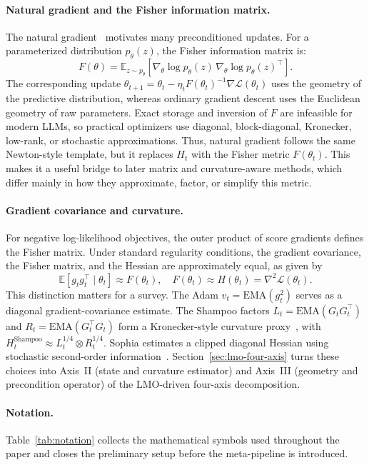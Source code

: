 \paragraph{Natural gradient and the Fisher information matrix.}
The natural gradient~\cite{amari1998natural} motivates many preconditioned
updates.  For a parameterized distribution $p_\theta(z)$, the Fisher
information matrix is:
\begin{equation}
  F(\theta)=\mathbb{E}_{z\sim p_\theta}\!\left[
    \nabla_\theta\log p_\theta(z)\,
    \nabla_\theta\log p_\theta(z)^\top
  \right].
  \label{eq:fisher-matrix}
\end{equation}
The corresponding update
$\theta_{t+1}=\theta_t-\eta_t F(\theta_t)^{-1}\nabla\mathcal{L}(\theta_t)$
uses the geometry of the predictive distribution, whereas ordinary gradient
descent uses the Euclidean geometry of raw parameters.  Exact storage and inversion of $F$ are infeasible
for modern LLMs, so practical optimizers use diagonal, block-diagonal,
Kronecker, low-rank, or stochastic approximations.
Thus, natural gradient follows the same Newton-style template, but it
replaces $H_t$ with the Fisher metric $F(\theta_t)$.  This makes it a useful
bridge to later matrix and curvature-aware methods, which differ mainly in how
they approximate, factor, or simplify this metric.

\paragraph{Gradient covariance and curvature.}
For negative log-likelihood objectives, the outer product of score gradients
defines the Fisher matrix.  Under standard regularity conditions, the gradient
covariance, the Fisher matrix, and the Hessian are approximately equal, as
given by
\begin{equation}
  \mathbb{E}\!\left[g_t g_t^\top\mid\theta_t\right]
  \approx F(\theta_t),
  \quad
  F(\theta_t) \approx H(\theta_t)=\nabla^2\mathcal{L}(\theta_t).
  \label{eq:fisher-identity}
\end{equation}
This distinction matters for a survey.  The Adam $v_t=\mathrm{EMA}(g_t^2)$ serves as a diagonal gradient-covariance estimate.  The Shampoo factors $L_t=\mathrm{EMA}(G_tG_t^\top)$ and $R_t=\mathrm{EMA}(G_t^\top G_t)$ form a Kronecker-style curvature proxy~\cite{gupta2018shampoo}, with $H_t^{\mathrm{Shampoo}}\approx L_t^{1/4}\otimes R_t^{1/4}$. Sophia estimates a clipped diagonal Hessian using stochastic second-order information~\cite{liu2023sophia}.  Section~\ref{sec:lmo-four-axis} turns these choices into Axis~II (state and curvature estimator) and Axis~III
(geometry and precondition operator) of the LMO-driven four-axis decomposition.

\paragraph{Notation.}
Table~\ref{tab:notation} collects the mathematical symbols used throughout
the paper and closes the preliminary setup before the meta-pipeline is
introduced.


